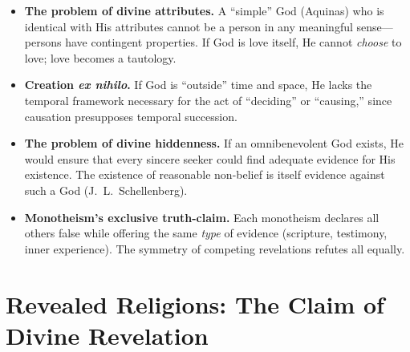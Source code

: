 \documentclass[11pt,twoside]{article}
\begin{document}
\begin{scheda}

\begin{itemize}
  \item \textbf{The problem of divine attributes.}
    A ``simple'' God (Aquinas) who is identical with His
    attributes cannot be a person in any meaningful sense---persons have
    contingent properties.  If God is love itself, He cannot \emph{choose}
    to love; love becomes a tautology.
  \item \textbf{Creation \emph{ex nihilo}.}
    If God is ``outside'' time and space, He
    lacks the temporal framework necessary for the act of ``deciding'' or
    ``causing,'' since causation presupposes temporal succession.
  \item \textbf{The problem of divine hiddenness.}
    If an omnibenevolent God exists, He would ensure that every sincere
    seeker could find adequate evidence for His existence.  The existence of
    reasonable non-belief is itself evidence against such a God
    (J.~L.~Schellenberg).
  \item \textbf{Mono\-theism's exclusive truth-claim.}
    Each monotheism declares all others false while offering the same
    \emph{type} of evidence (scripture, testimony, inner experience).  The
    symmetry of competing revelations refutes
    all equally.
\end{itemize}
\end{scheda}

\newpage

\section{Revealed Religions: The Claim of Divine Revelation}
\end{document}

